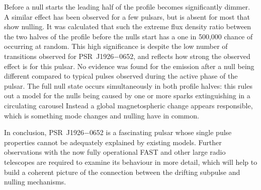 Before a null starts the leading half of the profile becomes significantly dimmer. A similar effect has been observed for a few pulsars, but is absent for most that show nulling. It was calculated that such the extreme flux density ratio between the two halves of the profile before the nulls start has a one in 500,000 chance of occurring at random. This high significance is despite the low number of transitions observed for PSR~J1926$-$0652, and reflects how strong the observed effect is for this pulsar. No evidence was found for the emission after a null being different compared to typical pulses observed during the active phase of the pulsar. The full null state occurs simultaneously in both profile halves: this rules out a model for the nulls being caused by one or more sparks extinguishing in a circulating carousel \citep[e.g.][]{RWxx2008}Instead a global magnetospheric change appears responsible, which is something mode changes and nulling have in common.

In conclusion, PSR~J1926$-$0652 is a fascinating pulsar whose single pulse properties cannot be adequately explained by existing models. Further observations with the now fully operational FAST and other large radio telescopes are required to examine its behaviour in more detail, which will help to build a coherent picture of the connection between the drifting subpulse and nulling mechanisms. 